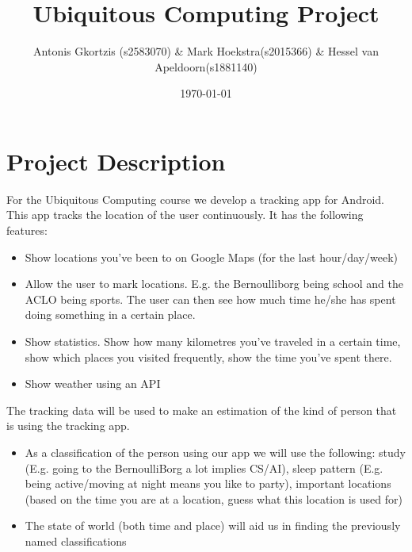 \documentclass[a4paper,10pt]{article}
\begin{document}
\title{Ubiquitous Computing Project}
\author{Antonis Gkortzis (s2583070) \& Mark Hoekstra(s2015366) \& Hessel van Apeldoorn(s1881140)}
\date{\today}
\maketitle
\section{Project Description}
For the Ubiquitous Computing course we develop a tracking app for Android. This app tracks the location of the user continuously. It has the following features:
\begin{itemize}
\item Show locations you've been to on Google Maps (for the last hour/day/week)
\item Allow the user to mark locations. E.g. the Bernoulliborg being school and the ACLO being sports. The user can then see how much time he/she has spent doing something in a certain place.
\item Show statistics. Show how many kilometres you've traveled in a certain time, show which places you visited frequently, show the time you've spent there.
\item Show weather using an API
\end{itemize}

The tracking data will be used to make an estimation of the kind of person that is using the tracking app.
\begin{itemize}
 \item As a classification of the person using our app we will use the following: study (E.g. going to the BernoulliBorg a lot implies CS/AI), sleep pattern (E.g. being active/moving at night means you like to party), important locations (based on the time you are at a location, guess what this location is used for)
\item The state of world (both time and place) will aid us in finding the previously named classifications
\end{itemize}
\end{document}
